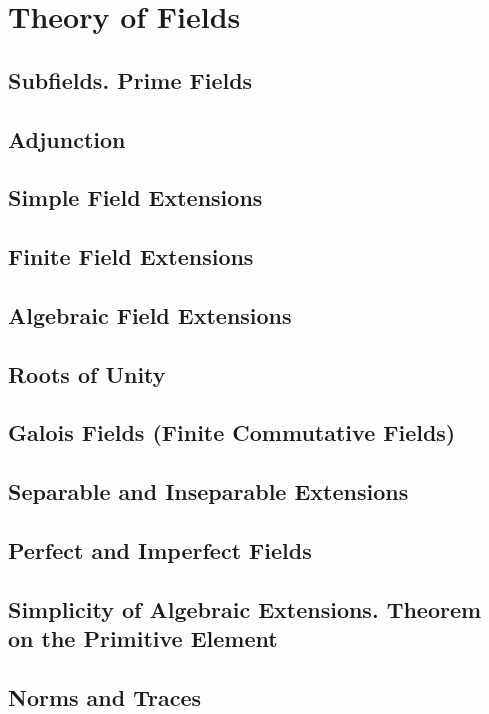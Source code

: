 \section{Theory of Fields}

\subsection{Subfields. Prime Fields}

\subsection{Adjunction}

\subsection{Simple Field Extensions}

\subsection{Finite Field Extensions}

\subsection{Algebraic Field Extensions}

\subsection{Roots of Unity}

\subsection{Galois Fields (Finite Commutative Fields)}

\subsection{Separable and Inseparable Extensions}

\subsection{Perfect and Imperfect Fields}

\subsection{Simplicity of Algebraic Extensions. Theorem on the Primitive Element}

\subsection{Norms and Traces}